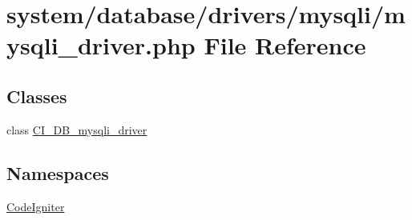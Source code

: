 \hypertarget{mysqli__driver_8php}{}\section{system/database/drivers/mysqli/mysqli\+\_\+driver.php File Reference}
\label{mysqli__driver_8php}
\subsection*{Classes}
\begin{DoxyCompactItemize}
\item 
class \mbox{\hyperlink{class_c_i___d_b__mysqli__driver}{C\+I\+\_\+\+D\+B\+\_\+mysqli\+\_\+driver}}
\end{DoxyCompactItemize}
\subsection*{Namespaces}
\begin{DoxyCompactItemize}
\item 
 \mbox{\hyperlink{namespace_code_igniter}{Code\+Igniter}}
\end{DoxyCompactItemize}
